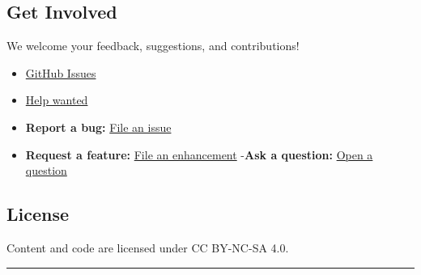 \subsection{Get Involved}\label{get-involved}

We welcome your feedback, suggestions, and contributions!

\begin{itemize}
\item
  \href{https://github.com/OER-Forge/OER-Forge/issues}{GitHub Issues}
\item
  \href{https://github.com/OER-Forge/OER-Forge/labels/help\%20wanted}{Help
  wanted}
\item
  \textbf{Report a bug:}
  \href{https://github.com/OER-Forge/OER-Forge/issues/new?labels=bug}{File
  an issue}
\item
  \textbf{Request a feature:}
  \href{https://github.com/OER-Forge/OER-Forge/issues/new?labels=enhancement}{File
  an enhancement} -\textbf{Ask a question:}
  \href{https://github.com/OER-Forge/OER-Forge/issues/new?labels=question}{Open
  a question}
\end{itemize}

\subsection{License}\label{license}

Content and code are licensed under CC BY-NC-SA 4.0.

\begin{center}\rule{0.5\linewidth}{0.5pt}\end{center}

\pandocbounded{}
